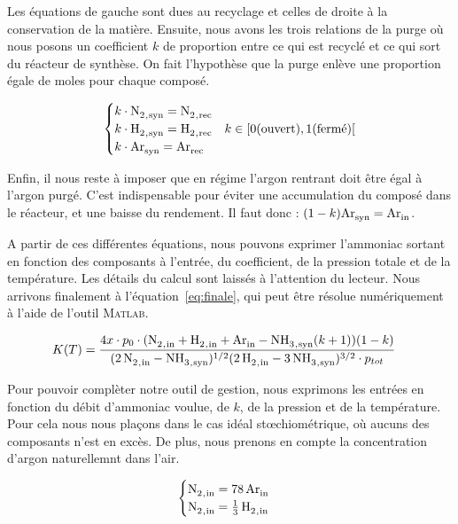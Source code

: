 Les équations de gauche sont dues au recyclage et celles de droite 
à la conservation de la matière. Ensuite, nous avons les trois relations
de la purge où nous posons un coefficient $k$ de proportion entre ce qui
est recyclé et ce qui sort du réacteur de synthèse. On fait l'hypothèse
que la purge enlève une proportion égale de moles pour chaque composé.

$$
\begin{cases}
 k\cdot \ce{N2_{,syn}} = \ce{N2_{,rec}} \\ 
 k\cdot \ce{H2_{,syn}} = \ce{H2_{,rec}} & k \in [0 \text{(ouvert)}, 1 \text{(fermé)}[ \\
 k\cdot \ce{Ar_{syn}} = \ce{Ar_{rec}} \\
\end{cases}
$$

Enfin, il nous reste à imposer que en régime l'argon rentrant doit être égal
à l'argon purgé. C'est indispensable pour éviter une accumulation du composé
dans le réacteur, et une baisse du rendement. 
Il faut donc : $(1 - k)\ce{Ar_{syn}} = \ce{Ar_{in}}$.

A partir de ces différentes équations, nous pouvons exprimer l'ammoniac
sortant en fonction des composants à l'entrée, du coefficient, de la pression
totale et de la température. Les détails du calcul sont laissés à l'attention 
du lecteur. Nous arrivons finalement à l'équation~\eqref{eq:finale}, qui peut
être résolue numériquement à l'aide de l'outil \textsc{Matlab}.  

\begin{align}
	K(T) & = \frac{4x\cdot p_0\cdot (\ce{N2_{,in} + H2_{,in} + Ar_{in}} - 
	\ce{NH3_{,syn}}(k + 1)) (1 - k)}{(\ce{2N2_{,in} - NH3_{,syn}})^{1/2} (\ce{2H2_{,in} - 3NH3_{,syn}})^{3/2} \cdot p_{tot}}
	\label{eq:finale}
\end{align}

Pour pouvoir complèter notre outil de gestion, nous exprimons les entrées 
en fonction du débit d'ammoniac voulue, de $k$, de la pression et de la
température. Pour cela nous nous plaçons dans le cas idéal stœchiométrique,
où aucuns des composants n'est en excès. De plus, nous prenons en compte la 
concentration d'argon naturellemnt dans l'air. 
 
$$
\begin{cases}
 \ce{N2_{,in}} = \ce{78Ar_{in}}\\ 
 \ce{N2_{,in}} = \ce{1/3H2_{,in}} \\
\end{cases}
$$
 
